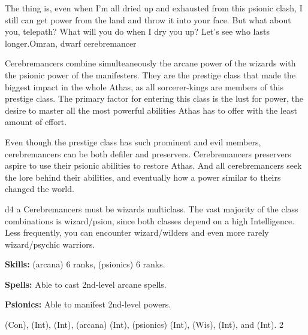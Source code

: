 {The thing is, even when I'm all dried up and exhausted from this psionic clash, I still can get power from the land and throw it into your face. But what about you, telepath? What will you do when I dry you up? Let's see who lasts longer.}{Omran, dwarf cerebremancer}
{Cerebremancers combine simulteaneously the arcane power of the wizards with the psionic power of the manifesters. They are the prestige class that made the biggest impact in the whole Athas, as all sorcerer-kings are members of this prestige class. The primary factor for entering this class is the lust for power, the desire to master all the most powerful abilities Athas has to offer with the least amount of effort.

Even though the prestige class has such prominent and evil members, cerebremancers can be both defiler and preservers. Cerebremancers preservers aspire to use their psionic abilities to restore Athas. And all cerebremancers seek the lore behind their abilities, and eventually how a power similar to theirs changed the world.
}
{d4}
{a}
{Cerebremancers must be wizards multiclass. The vast majority of the class combinations is wizard/psion, since both classes depend on a high Intelligence. Less frequently, you can encounter wizard/wilders and even more rarely wizard/psychic warriors.}
{
\textbf{Skills:}  (arcana) 6 ranks,  (psionics) 6 ranks.

\textbf{Spells:} Able to cast 2nd-level arcane spells.

\textbf{Psionics:} Able to manifest 2nd-level powers.
}
{
 (Con),  (Int),  (Int),  (arcana) (Int),  (psionics) (Int),  (Wis),  (Int), and  (Int).
}
{2}
